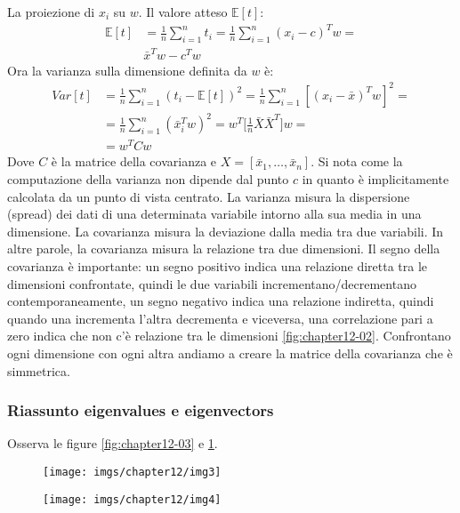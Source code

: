 		La proiezione di $x_i$ su $w$.
		Il valore atteso $\mathbb{E}[t]$:
		\begin{align*}
			\mathbb{E}[t] &= \frac{1}{n}\sum\limits_{i=1}^nt_i = \frac{1}{n}\sum\limits_{i=1}^n(x_i-c)^Tw=\\
			&\bar{x}^Tw-c^Tw
		\end{align*}
		Ora la varianza sulla dimensione definita da $w$ \`e:
		\begin{align*}
			Var[t] &= \frac{1}{n}\sum\limits_{i = 1}^n(t_i -\mathbb{E}[t])^2 = \frac{1}{n}\sum\limits_{i=1}^n[(x_i-\bar{x})^Tw]^2=\\
			&=\frac{1}{n}\sum\limits_{i=1}^n(\bar{x}_i^Tw)^2 = w^T\bigl[\frac{1}{n}\bar{X}\bar{X}^T\bigr]w=\\
			&=w^TCw
		\end{align*}
		Dove $C$ \`e la matrice della covarianza e $X = [\bar{x}_1,\dots,\bar{x}_n]$.
		Si nota come la computazione della varianza non dipende dal punto $c$ in quanto \`e implicitamente calcolata da un punto di vista centrato. 
		La varianza misura la dispersione (spread) dei dati di una determinata variabile intorno alla sua media in una dimensione. 
		La covarianza misura la deviazione dalla media tra due variabili. 
		In altre parole, la covarianza misura la relazione tra due dimensioni. 
		Il segno della covarianza \`e importante: un segno positivo indica una relazione diretta tra le dimensioni confrontate, quindi le due variabili incrementano/decrementano contemporaneamente, un segno negativo indica una relazione indiretta, quindi quando una incrementa l'altra decrementa e viceversa, una correlazione pari a zero indica che non c'\`e relazione tra le dimensioni  \ref{fig:chapter12-02}.
		Confrontano ogni dimensione con ogni altra andiamo a creare la matrice della covarianza che \`e simmetrica.
		
		\subsubsection{Riassunto eigenvalues e eigenvectors}
		
		Osserva le figure \ref{fig:chapter12-03} e \ref{fig:chapter12-04}.
		
		\begin{figure}
			\centering
			\begin{minipage}{.6\textwidth}
				\centering
				\texttt{[image: imgs/chapter12/img3]}
				\caption{}
				\label{fig:chapter12-03}
			\end{minipage}%
			\begin{minipage}{.4\textwidth}
				\centering
				\texttt{[image: imgs/chapter12/img4]}
				\caption{}
				\label{fig:chapter12-04}
			\end{minipage}
		\end{figure}
		
